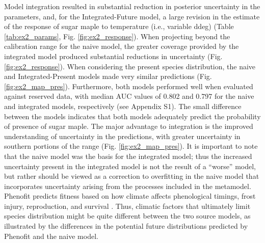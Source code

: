 \documentclass[11pt]{article}
\newcommand{\rev}[1]{{\color{RoyalBlue}#1}}
\begin{document}
Model integration resulted in substantial reduction in posterior uncertainty in the parameters, and, for the Integrated-Future model, a large revision in the estimate of the response of sugar maple to temperature (i.e., variable ddeg) (Table \ref{tab:ex2_params}, Fig. \ref{fig:ex2_response}).
When projecting beyond the calibration range for the naive model, the greater coverage provided by the integrated model produced substantial reductions in uncertainty (Fig. \ref{fig:ex2_response}).
When considering the present species distribution, the naive and Integrated-Present models made very similar predictions (Fig. \ref{fig:ex2_map_pres}).
Furthermore, both models performed well when evaluated against reserved data, with \rev{median} AUC values of 0.802 and 0.797 for the naive and integrated models, respectively (see Appendix S1).
The small difference between the models indicates that both models adequately predict the probability of presence of sugar maple.
The major advantage to integration is the improved understanding of uncertainty in the predictions, with greater uncertainty in southern portions of the range (Fig. \ref{fig:ex2_map_pres}).
It is important to note that the naive model was the basis for the integrated model; thus the increased uncertainty present in the integrated model is not the result of a ``worse'' model, but rather should be viewed as a correction to overfitting in the naive model that incorporates uncertainty arising from the processes included in the metamodel.
Phenofit predicts fitness based on how climate affects phenological timings, frost injury, reproduction, and survival \citep{Chuine2001, Morin2009}.
Thus, climatic factors that ultimately limit species distribution might be quite different between the two source models, as illustrated by the differences in the potential future distributions predicted by Phenofit and the naive model.
\end{document}
